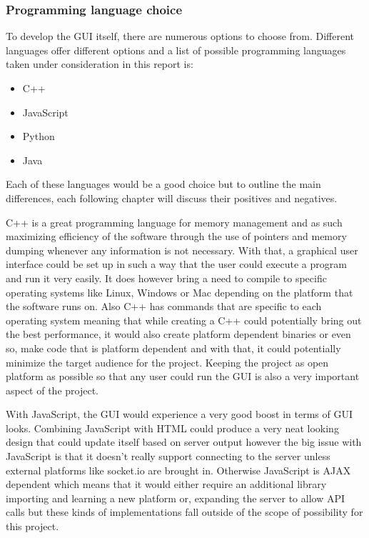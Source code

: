 \documentclass{report}
\begin{document}
      \subsubsection{Programming language choice}
        To develop the GUI itself, there are numerous options to choose from. Different languages offer different options and a list of possible programming languages taken under consideration in this report is:
        
          \begin{itemize}
            \item C++
            \item JavaScript
            \item Python
            \item Java
          \end{itemize}

        Each of these languages would be a good choice but to outline the main differences, each following chapter will discuss their positives and negatives.

        C++ is a great programming language for memory management and as such maximizing efficiency of the software through the use of pointers and memory dumping whenever any information is not necessary. With that, a graphical user interface could be set up in such a way that the user could execute a program and run it very easily. It does however bring a need to compile to specific operating systems like Linux, Windows or Mac depending on the platform that the software runs on\cite{cplus}. Also C++ has commands that are specific to each operating system meaning that while creating a C++ could potentially bring out the best performance, it would also create platform dependent binaries or even so, make code that is platform dependent and with that, it could potentially minimize the target audience for the project. Keeping the project as open platform as possible so that any user could run the GUI is also a very important aspect of the project.

        With JavaScript, the GUI would experience a very good boost in terms of GUI looks. Combining JavaScript with HTML could produce a very neat looking design that could update itself based on server output however the big issue with JavaScript is that it doesn't really support connecting to the server unless external platforms like socket.io\cite{socketio} are brought in. Otherwise JavaScript is AJAX dependent which means that it would either require an additional library importing and learning a new platform or, expanding the server to allow API calls but these kinds of implementations fall outside of the scope of possibility for this project.
\end{document}
